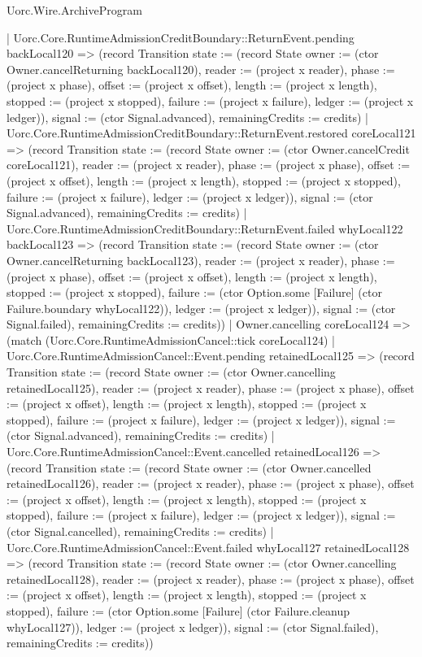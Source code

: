 \begin{lexlean}{Uorc.Wire.ArchiveProgram}
\begin{semanticmodule}
{      | Uorc.Core.RuntimeAdmissionCreditBoundary::ReturnEvent.pending backLocal120 => (record Transition {state := (record State {owner := (ctor Owner.cancelReturning backLocal120), reader := (project x reader), phase := (project x phase), offset := (project x offset), length := (project x length), stopped := (project x stopped), failure := (project x failure), ledger := (project x ledger)}), signal := (ctor Signal.advanced), remainingCredits := credits})
      | Uorc.Core.RuntimeAdmissionCreditBoundary::ReturnEvent.restored coreLocal121 => (record Transition {state := (record State {owner := (ctor Owner.cancelCredit coreLocal121), reader := (project x reader), phase := (project x phase), offset := (project x offset), length := (project x length), stopped := (project x stopped), failure := (project x failure), ledger := (project x ledger)}), signal := (ctor Signal.advanced), remainingCredits := credits})
      | Uorc.Core.RuntimeAdmissionCreditBoundary::ReturnEvent.failed whyLocal122 backLocal123 => (record Transition {state := (record State {owner := (ctor Owner.cancelReturning backLocal123), reader := (project x reader), phase := (project x phase), offset := (project x offset), length := (project x length), stopped := (project x stopped), failure := (ctor Option.some [Failure] (ctor Failure.boundary whyLocal122)), ledger := (project x ledger)}), signal := (ctor Signal.failed), remainingCredits := credits}))
    | Owner.cancelling coreLocal124 => (match (Uorc.Core.RuntimeAdmissionCancel::tick coreLocal124)
      | Uorc.Core.RuntimeAdmissionCancel::Event.pending retainedLocal125 => (record Transition {state := (record State {owner := (ctor Owner.cancelling retainedLocal125), reader := (project x reader), phase := (project x phase), offset := (project x offset), length := (project x length), stopped := (project x stopped), failure := (project x failure), ledger := (project x ledger)}), signal := (ctor Signal.advanced), remainingCredits := credits})
      | Uorc.Core.RuntimeAdmissionCancel::Event.cancelled retainedLocal126 => (record Transition {state := (record State {owner := (ctor Owner.cancelled retainedLocal126), reader := (project x reader), phase := (project x phase), offset := (project x offset), length := (project x length), stopped := (project x stopped), failure := (project x failure), ledger := (project x ledger)}), signal := (ctor Signal.cancelled), remainingCredits := credits})
      | Uorc.Core.RuntimeAdmissionCancel::Event.failed whyLocal127 retainedLocal128 => (record Transition {state := (record State {owner := (ctor Owner.cancelling retainedLocal128), reader := (project x reader), phase := (project x phase), offset := (project x offset), length := (project x length), stopped := (project x stopped), failure := (ctor Option.some [Failure] (ctor Failure.cleanup whyLocal127)), ledger := (project x ledger)}), signal := (ctor Signal.failed), remainingCredits := credits}))
}
\end{semanticmodule}
\end{lexlean}
